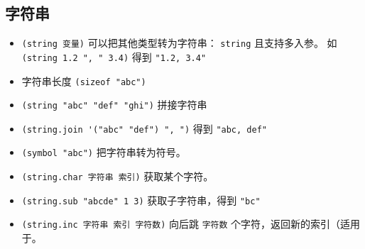 \subsection{字符串}
\begin{itemize}
\item \verb`(string 变量)` 可以把其他类型转为字符串： \verb`string` 且支持多入参。 如 \verb`(string 1.2 ", " 3.4)` 得到 \verb`"1.2, 3.4"`
\item 字符串长度 \verb`(sizeof "abc")`
\item \verb`(string "abc" "def" "ghi")` 拼接字符串
\item \verb`(string.join '("abc" "def") ", ")` 得到 \verb`"abc, def"`
\item \verb`(symbol "abc")` 把字符串转为符号。
\item \verb`(string.char 字符串 索引)` 获取某个字符。
\item \verb`(string.sub "abcde" 1 3)` 获取子字符串，得到 \verb`"bc"`
\item \verb`(string.inc 字符串 索引 字符数)` 向后跳 \verb`字符数` 个字符，返回新的索引（适用于。
\end{itemize}



